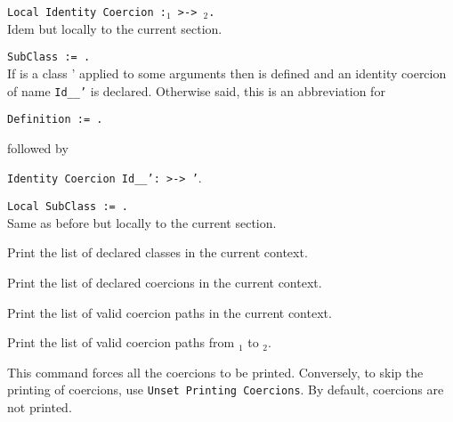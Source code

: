 \begin{Variants}
\item {\tt Local Identity Coercion {\ident}:{\ident$_1$} >-> {\ident$_2$}.} \\
Idem but locally to the current section.

\item {\tt SubClass {\ident} := {\type}.} \\
 If {\type} is a class
{\ident'} applied to some arguments then {\ident} is defined and an
identity coercion of name {\tt Id\_{\ident}\_{\ident'}} is
declared. Otherwise said, this is an abbreviation for 

{\tt Definition {\ident} := {\type}.} 

 followed by

{\tt Identity Coercion Id\_{\ident}\_{\ident'}:{\ident} >-> {\ident'}}.

\item {\tt Local SubClass {\ident} := {\type}.} \\
Same as before but locally to the current section.

\end{Variants}


Print the list of declared classes in the current context.

Print the list of declared coercions in the current context.

Print the list of valid coercion paths in the current context.

Print the list of valid coercion paths from {\class$_1$} to {\class$_2$}.



This command forces all the coercions to be printed.
Conversely, to skip the printing of coercions, use
 {\tt Unset Printing Coercions}.
By default, coercions are not printed.


